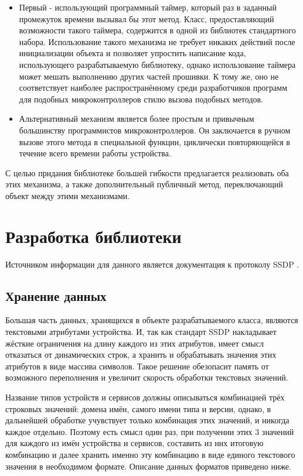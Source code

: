 \begin{itemize}
	\item Первый - использующий программный таймер, который раз в заданный промежуток времени вызывал бы этот метод.
	Класс, предоставляющий возможности такого таймера, содержится в одной из библиотек стандартного набора.
	Использование такого механизма не требует никаких действий после инициализации объекта и позволяет упростить написание кода, использующего разрабатываемую библиотеку, однако использование таймера может мешать выполнению других частей прошивки.
	К тому же, оно не соответствует наиболее распространённому среди разработчиков программ для подобных микроконтроллеров стилю вызова подобных методов.
	\item Альтернативный механизм является более простым и привычным большинству программистов микроконтроллеров.
Он заключается в ручном вызове этого метода в специальной функции, циклически повторяющейся в течение всего времени работы устройства.
\end{itemize}

С целью придания библиотеке большей гибкости предлагается реализовать оба этих механизма, а также дополнительный публичный метод, переключающий объект между этими механизмами.

\section{Разработка библиотеки}
Источником информации для данного является документация к протоколу SSDP \cite{ssdp-doc}.

\subsection{Хранение данных}
Большая часть данных, хранящихся в объекте разрабатываемого класса, являются текстовыми атрибутами устройства.
И, так как стандарт SSDP накладывает жёсткие ограничения на длину каждого из этих атрибутов, имеет смысл отказаться от динамических строк, а хранить и обрабатывать значения этих атрибутов в виде массива символов.
Такое решение обезопасит память от возможного переполнения и увеличит скорость обработки текстовых значений.

Название типов устройств и сервисов должны описываться комбинацией трёх строковых значений: домена имён, самого имени типа и версии, однако, в дальнейшей обработке учувствует только комбинация этих значений, и никогда каждое отдельно.
Поэтому есть смысл один раз, при получении этих 3 значений для каждого из имён устройства и сервисов, составить из них итоговую комбинацию и далее хранить именно эту комбинацию в виде единого текстового значения в необходимом формате.
Описание данных форматов приведено ниже.

